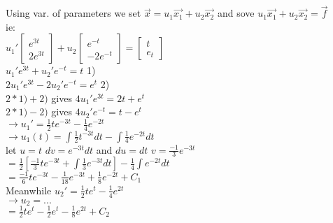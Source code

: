 \documentclass[12pt]{article}
\begin{document}
	Using var. of parameters we set $\overrightarrow{x} = u_1\overrightarrow{x_1} + u_2\overrightarrow{x_2}$ and sove $u_1 \overrightarrow{x_1} + u_2\overrightarrow{x_2} = \overrightarrow{f}$\\
	
	ie:\\
	$u_1'\begin{bmatrix} e^{3t} \\ 2e^{3t} \end{bmatrix} + u_2 \begin{bmatrix} e^{-t} \\ -2e^{-t} \end{bmatrix} = \begin{bmatrix} t \\ e_t \end{bmatrix}$\\
	$u_1'e^{3t} + u_2'e^{-t} = t$ 1)\\
	$2u_1'e^{3t} - 2u_2'e^{-t} = e^t$ 2)\\
	
	$2 * 1) + 2)$ gives $4u_1'e^{3t} = 2t + e^t$\\
	$2 * 1) - 2)$ gives $4u_2'e^{-t} = t - e^t$\\
	
	$\rightarrow u_1' = \frac{1}{2}te^{-3t} - \frac{1}{4}e^{-2t}$\\
	$\rightarrow u_1(t) = \int \frac{1}{2}t^{-3t}dt - \int \frac{1}{4}e^{-2t} dt$\\
	let $u = t$ $dv = e^{-3t}dt$ and $du = dt$ $v = \frac{-1}{3}e^{-3t}$\\
	$= \frac{1}{2}[\frac{-1}{3}te^{-3t} + \int \frac{1}{3}e^{-3t}dt] - \frac{1}{4} \int e^{-2t}dt$\\
	$= \frac{-1}{6}te^{-3t} - \frac{1}{18}e^{-3t} + \frac{1}{8}e^{-2t} + C_1$\\
	
	Meanwhile $u_2' = \frac{1}{2}te^{t} - \frac{1}{4}e^{2t}$\\
	$\rightarrow u_2 = ...$\\
	$= \frac{1}{2}te^t - \frac{1}{2}e^t - \frac{1}{8}e^{2t} + C_2$\\
	
\end{document}
